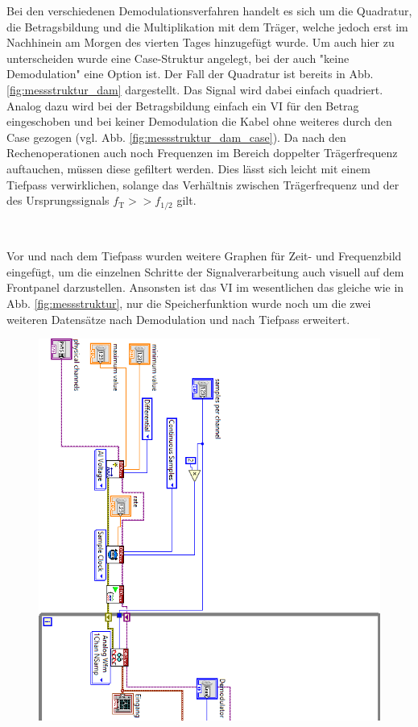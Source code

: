 Bei den verschiedenen Demodulationsverfahren handelt es sich um die Quadratur, die Betragsbildung und die Multiplikation mit dem Träger, welche jedoch erst im Nachhinein am Morgen des vierten Tages hinzugefügt wurde.
Um auch hier zu unterscheiden wurde eine Case-Struktur angelegt, bei der auch "keine Demodulation" eine Option ist.
Der Fall der Quadratur ist bereits in Abb. \ref{fig:messstruktur_dam} dargestellt.
Das Signal wird dabei einfach quadriert.
Analog dazu wird bei der Betragsbildung einfach ein VI für den Betrag eingeschoben und bei keiner Demodulation die Kabel ohne weiteres durch den Case gezogen (vgl. Abb. \ref{fig:messstruktur_dam_case}). 
Da nach den Rechenoperationen auch noch Frequenzen im Bereich doppelter Trägerfrequenz auftauchen, müssen diese gefiltert werden.
Dies lässt sich leicht mit einem Tiefpass verwirklichen, solange das Verhältnis zwischen Trägerfrequenz und der des Ursprungssignals $f_\text{T} >> f_{1/2}$ gilt.
	
\

Vor und nach dem Tiefpass wurden weitere Graphen für Zeit- und Frequenzbild eingefügt, um die einzelnen Schritte der Signalverarbeitung auch visuell auf dem Frontpanel darzustellen.
Ansonsten ist das VI im wesentlichen das gleiche wie in Abb. \ref{fig:messstruktur}, nur die Speicherfunktion wurde noch um die zwei weiteren Datensätze nach Demodulation und nach Tiefpass erweitert.

\newpage
\pagestyle{empty}

\begin{figure}[H]
	\centering
	\includegraphics[width=\textwidth]{pic/messstruktur_dam1.png}
\end{figure} 

